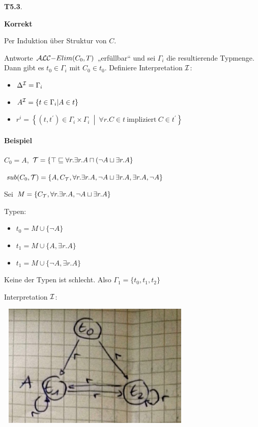 \textbf{T5.3}. 

\textbf{Korrekt}

Per Induktion über Struktur von $C$.

Antworte $\text {$\mathcal{A}\mathcal{L}\mathcal{C}$}\mathrm{-}Elim(C_{0},T)$ „erfüllbar`` und sei
$\Gamma_{i}$ die resultierende Typmenge. Dann gibt es
$t_{0} \in \Gamma_{i}$ mit $C_{0} \in t_{0}$. Definiere
Interpretation $\mathcal{I}$:

\begin{itemize}
\item
  $\Delta^{\mathcal{I}} = \Gamma_{i}$
\item
  $A^{\mathcal{I}} = \left\{ t \in \Gamma_{i} \middle| A \in t \right\}$
\item
  $r^{i} = \left\{ \left( t,t^{'} \right)\in \Gamma_i \times \Gamma_i\  \middle| \ \forall r.C \in t\ \mathrm{\text{impliziert}}\ C \in t^{'} \right\}$
\end{itemize} 

\paragraph{Beispiel}

$C_0 = A$, $\mathcal{T} = \{\top \sqsubseteq \forall r.\exists r.A \sqcap (\neg A \sqcup \exists r.A\}$

$sub(C_0, \mathcal{T}) = \{A,C_{\mathcal{T}}, \forall r.\exists r.A, \neg A \sqcup \exists r.A, \exists r.A, \neg A\}$

Sei $M = \{C_{\mathcal{T}}, \forall r.\exists r.A, \neg A \sqcup \exists r.A\}$ 

Typen:

\begin{itemize}
  \item $t_0 = M \cup \{\neg A\}$
  \item $t_1 = M \cup \{A,\exists r.A\}$
  \item $t_1 = M \cup \{\neg A,\exists r.A\}$
\end{itemize}

Keine der Typen ist schlecht. Also $\Gamma_1 = \{t_0,t_1,t_2\}$

Interpretation $\mathcal{I}$:

\includegraphics[width=3.71910in,height=2.33200in]{media/52typelim.png}

